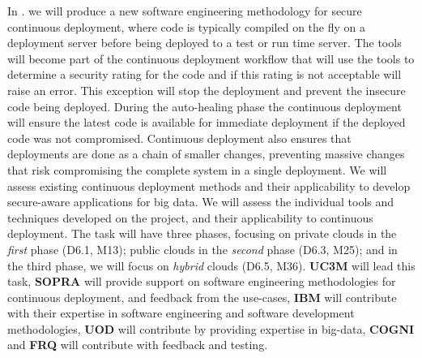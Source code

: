 \begin{Workpackage}{\thewpno}
\begin{Task}
\TaskResults{%
}
\TaskHeader{}

In \theTask. we will produce a new software engineering methodology for secure continuous deployment, where code is typically compiled on the fly on a deployment server before being deployed to a test or run time server.  The \TheProject{} tools will become part of the continuous deployment workflow that will use the tools to determine a security rating for the code and if this rating is not acceptable will raise an error. This exception will stop the deployment and prevent the insecure code being deployed. During the auto-healing phase the continuous deployment will ensure the latest code is available for immediate deployment if the deployed code was not compromised. Continuous deployment also ensures that deployments are done as a chain of smaller changes, preventing massive changes that risk compromising the complete system in a single deployment.  We will assess existing continuous deployment methods and their applicability to develop secure-aware applications for big data. We will assess the individual tools and techniques developed on the \TheProject{} project, and their applicability to continuous deployment. The task will have three phases, focusing on private clouds in the \emph{first} phase (D6.1, M13); public clouds in the \emph{second} phase (D6.3, M25); and in the third phase, we will focus on \emph{hybrid} clouds (D6.5, M36). \textbf{UC3M} will lead this task, \textbf{SOPRA} will provide support on software engineering methodologies for continuous deployment, and feedback from the use-cases, \textbf{IBM} will contribute with their expertise in software engineering and software development methodologies, \textbf{UOD} will contribute by providing expertise in big-data, \textbf{COGNI} and \textbf{FRQ} will contribute with feedback and testing.
\end{Task}


\end{Workpackage}
